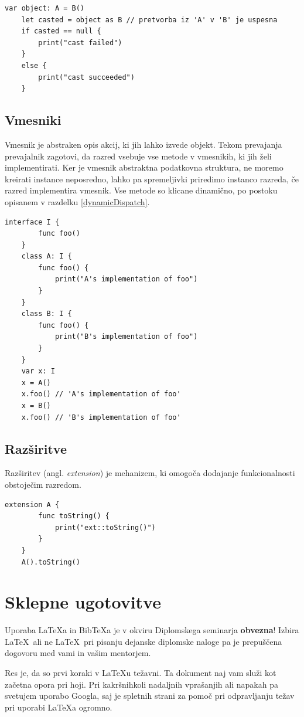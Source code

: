 \documentclass[a4paper, 12pt]{book}
\newcommand{\BibTeX}{{\sc Bib}\TeX}
\begin{document}
\begin{lstlisting}[caption={Pretvorba razrede iz sheme ~\ref{vtables}}, captionpos=b]
	var object: A = B()
	let casted = object as B // pretvorba iz 'A' v 'B' je uspesna
	if casted == null {
	    print("cast failed")
	}
	else {
	    print("cast succeeded")
	}
\end{lstlisting}

\section{Vmesniki}

Vmesnik je abstraken opis akcij, ki jih lahko izvede objekt. Tekom prevajanja prevajalnik zagotovi, da razred vsebuje vse metode v vmesnikih, ki jih želi implementirati. Ker je vmesnik abstraktna podatkovna struktura, ne moremo kreirati instance neposredno, lahko pa spremeljivki priredimo instanco razreda, če razred implementira vmesnik. Vse metode so klicane dinamično, po postoku opisanem v razdelku \ref{dynamicDispatch}.

\begin{lstlisting}[caption={Vmesniki}, label={lst:interfaces}, captionpos=b]
	interface I {
	    func foo()
	}
	class A: I {
	    func foo() {
	        print("A's implementation of foo")
	    }
	}
	class B: I {
	    func foo() {
	        print("B's implementation of foo")
	    }
	}
	var x: I
	x = A()
	x.foo() // 'A's implementation of foo'
	x = B()
	x.foo() // 'B's implementation of foo'
\end{lstlisting}

\section{Razširitve}

Razširitev (angl. \textit{extension}) je mehanizem, ki omogoča dodajanje funkcionalnosti obstoječim razredom. 

\begin{lstlisting}[caption={Razširitev razreda iz ~\ref{lbl:interfaces}}, captionpos=b]
	extension A {
	    func toString() {
	        print("ext::toString()")
	    }
	}
	A().toString()
\end{lstlisting}


\chapter{Sklepne ugotovitve}

Uporaba \LaTeX{a} in \BibTeX{a} je v okviru Diplomskega seminarja \textbf{obvezna}!
Izbira \LaTeX\ ali ne \LaTeX\ pri pisanju dejanske diplomske naloge pa je pre\-pu\-šče\-na dogovoru med vami in vašim mentorjem.

Res je, da so prvi koraki v \LaTeX{}u težavni. 
Ta dokument naj vam služi kot začetna opora pri hoji.
Pri kakršnihkoli nadaljnih vprašanjih ali napakah pa svetujem uporabo Googla, saj je spletnih strani za pomoč pri odpravljanju težav pri uporabi \LaTeX{}a ogromno.


\newpage %

\clearpage
{}


\end{document}
